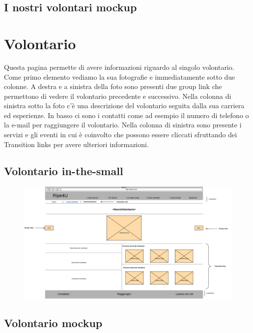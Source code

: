         \subsection{I nostri volontari mockup}

    \section{Volontario}
    Questa pagina permette di avere informazioni riguardo al singolo volontario.
    Come primo elemento vediamo la sua fotografie e immediatamente sotto due
    colonne. A destra e a sinistra della foto sono presenti due group link che
    permettono di vedere il volontario precedente e successivo. Nella colonna di
    sinistra sotto la foto c'è una descrizione del volontario seguita dalla sua
    carriera ed esperienze. In basso ci sono i contatti come ad esempio il
    numero di telefono o la e-mail per raggiungere il volontario. Nella colonna
    di sinistra sono presente i servizi e gli eventi in cui è coinvolto che
    possono essere cliccati sfruttando dei Transition links per avere ulteriori
    informazioni.

        \subsection{Volontario in-the-small}
        \begin{figure}[H]
            \centering
            \includegraphics[scale=0.38]{resources/images/volontario-in-the-small.jpg}
        \end{figure}

        \subsection{Volontario mockup}

